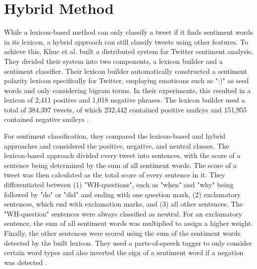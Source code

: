 \section{Hybrid Method}
While a lexicon-based method can only classify a tweet if it finds sentiment words in its lexicon, a hybrid approach can still classify tweets using other features. To achieve this, Khuc et al. built a distributed system for Twitter sentiment analysis. They divided their system into two components, a lexicon builder and a sentiment classifier. Their lexicon builder automatically constructed a sentiment polarity lexicon specifically for Twitter, employing emoticons such as ":)" as seed words and only considering bigram terms. In their experiments, this resulted in a lexicon of 2,411 positive and 1,018 negative phrases. The lexicon builder used a total of 384,397 tweets, of which 232,442 contained positive smileys and 151,955 contained negative smileys \cite{khuc}.

For sentiment classification, they compared the lexicon-based and hybrid approaches and considered the positive, negative, and neutral classes. The lexicon-based approach divided every tweet into sentences, with the score of a sentence being determined by the sum of all sentiment words. The score of a tweet was then calculated as the total score of every sentence in it. They differentiated between (1) "WH-questions", such as "when" and "why" being followed by "do" or "did" and ending with one question mark, (2) exclamatory sentences, which end with exclamation marks, and (3) all other sentences. The "WH-question" sentences were always classified as neutral. For an exclamatory sentence, the sum of all sentiment words was multiplied to assign a higher weight. Finally, the other sentences were scored using the sum of the sentiment words detected by the built lexicon. They used a parts-of-speech tagger to only consider certain word types and also inverted the sign of a sentiment word if a negation was detected \cite{khuc}.

